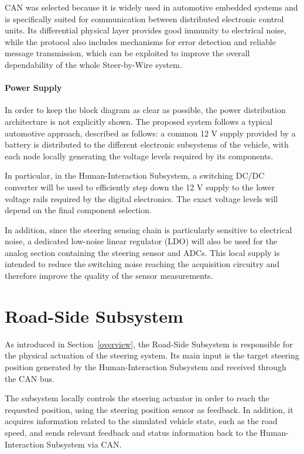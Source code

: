 CAN was selected because it is widely used in automotive embedded systems and is specifically suited for communication between distributed electronic control units. Its differential physical layer provides good immunity to electrical noise, while the protocol also includes mechanisms for error detection and reliable message transmission, which can be exploited to improve the overall dependability of the whole Steer-by-Wire system.

\paragraph{Power Supply}
In order to keep the block diagram as clear as possible, the power distribution architecture is not explicitly shown. The proposed system follows a typical automotive approach, described as follows: a common 12 V supply provided by a battery is distributed to the different electronic subsystems of the vehicle, with each node locally generating the voltage levels required by its components.

In particular, in the Human-Interaction Subsystem, a switching DC/DC converter will be used to efficiently step down the 12 V supply to the lower voltage rails required by the digital electronics. The exact voltage levels will depend on the final component selection.

In addition, since the steering sensing chain is particularly sensitive to electrical noise, a dedicated low-noise linear regulator (LDO) will also be used for the analog section containing the steering sensor and ADCs. This local supply is intended to reduce the switching noise reaching the acquisition circuitry and therefore improve the quality of the sensor measurements.












\section{Road-Side Subsystem}

As introduced in Section~\ref{overview}, the Road-Side Subsystem is responsible for the physical actuation of the steering system. Its main input is the target steering position generated by the Human-Interaction Subsystem and received through the CAN bus.

The subsystem locally controls the steering actuator in order to reach the requested position, using the steering position sensor as feedback. In addition, it acquires information related to the simulated vehicle state, such as the road speed, and sends relevant feedback and status information back to the Human-Interaction Subsystem via CAN.

